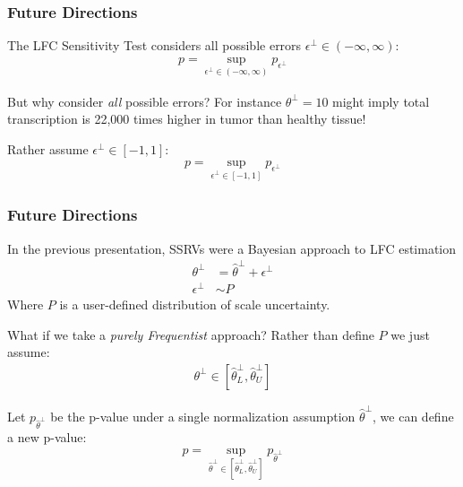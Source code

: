 \documentclass[11pt,t]{beamer}
\begin{document}
\begin{frame}
  \frametitle{Future Directions}

  The LFC Sensitivity Test considers all possible errors \(\epsilon^\perp \in (-\infty, \infty)\):
  \begin{align*}
    p = \sup_{\epsilon^\perp \in (-\infty,\infty)} p_{\epsilon^\perp}
  \end{align*}

  \pause

  \vspace{10px}
  But why consider \textit{all} possible errors? For instance \(\theta^\perp=10\) might imply total transcription is 22,000 times higher in tumor than healthy tissue!

  \pause
  
  \vspace{10px}
  Rather assume \(\epsilon^\perp \in [-1,1]\):
  \begin{align*}
    p = \sup_{\epsilon^\perp \in [-1,1]} p_{\epsilon^\perp}
  \end{align*}

  \pause
  
\end{frame}

\begin{frame}
  \frametitle{Future Directions}

  In the previous presentation, SSRVs were a Bayesian approach to LFC estimation
  \begin{align*}
    \theta^\perp &= \hat{\theta}^\perp + \epsilon^\perp \\
    \epsilon^\perp &\sim P
  \end{align*}
  Where \(P\) is a user-defined distribution of scale uncertainty.

  \pause

  \vspace{10px}

  What if we take a \textit{purely Frequentist} approach? Rather than define \(P\) we just assume:
  \begin{align*}
    \theta^\perp \in [\hat{\theta}^\perp_L, \hat{\theta}^\perp_U]
  \end{align*}

  Let \(p_{\hat{\theta}^\perp}\) be the p-value under a single normalization assumption \(\hat{\theta}^\perp\), we can define a new p-value:
  \begin{align*}
    p = \sup_{\hat{\theta}^\perp \in [\hat{\theta}^\perp_L,\hat{\theta}^\perp_U]} p_{\hat{\theta}^\perp}
  \end{align*}
\end{frame}
\end{document}
